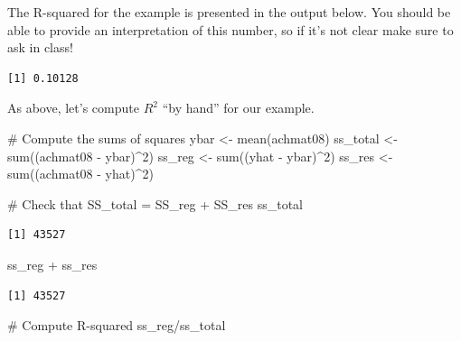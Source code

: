 \documentclass[
  letterpaper,
  DIV=11,
  numbers=noendperiod]{scrreprt}
\newenvironment{Shaded}{\begin{snugshade}}{\end{snugshade}}
\newcommand{\CommentTok}[1]{\textcolor[rgb]{0.37,0.37,0.37}{#1}}
\newcommand{\DecValTok}[1]{\textcolor[rgb]{0.68,0.00,0.00}{#1}}
\newcommand{\FunctionTok}[1]{\textcolor[rgb]{0.28,0.35,0.67}{#1}}
\newcommand{\NormalTok}[1]{\textcolor[rgb]{0.00,0.23,0.31}{#1}}
\newcommand{\OtherTok}[1]{\textcolor[rgb]{0.00,0.23,0.31}{#1}}
\newcommand{\SpecialCharTok}[1]{\textcolor[rgb]{0.37,0.37,0.37}{#1}}
\begin{document}
The R-squared for the example is presented in the output below. You
should be able to provide an interpretation of this number, so if it's
not clear make sure to ask in class!

\begin{Shaded}
\end{Shaded}

\begin{verbatim}
[1] 0.10128
\end{verbatim}

As above, let's compute \(R^2\) ``by hand'' for our example.

\begin{Shaded}
\begin{Highlighting}[]
\CommentTok{\# Compute the sums of squares}
\NormalTok{ybar }\OtherTok{\textless{}{-}} \FunctionTok{mean}\NormalTok{(achmat08)}
\NormalTok{ss\_total }\OtherTok{\textless{}{-}} \FunctionTok{sum}\NormalTok{((achmat08 }\SpecialCharTok{{-}}\NormalTok{ ybar)}\SpecialCharTok{\^{}}\DecValTok{2}\NormalTok{)}
\NormalTok{ss\_reg }\OtherTok{\textless{}{-}} \FunctionTok{sum}\NormalTok{((yhat }\SpecialCharTok{{-}}\NormalTok{ ybar)}\SpecialCharTok{\^{}}\DecValTok{2}\NormalTok{)}
\NormalTok{ss\_res }\OtherTok{\textless{}{-}}  \FunctionTok{sum}\NormalTok{((achmat08 }\SpecialCharTok{{-}}\NormalTok{ yhat)}\SpecialCharTok{\^{}}\DecValTok{2}\NormalTok{)}

\CommentTok{\# Check that SS\_total = SS\_reg + SS\_res}
\NormalTok{ss\_total}
\end{Highlighting}
\end{Shaded}

\begin{verbatim}
[1] 43527
\end{verbatim}

\begin{Shaded}
\begin{Highlighting}[]
\NormalTok{ss\_reg }\SpecialCharTok{+}\NormalTok{ ss\_res}
\end{Highlighting}
\end{Shaded}

\begin{verbatim}
[1] 43527
\end{verbatim}

\begin{Shaded}
\begin{Highlighting}[]
\CommentTok{\# Compute R{-}squared}
\NormalTok{ss\_reg}\SpecialCharTok{/}\NormalTok{ss\_total}
\end{Highlighting}
\end{Shaded}
\end{document}
